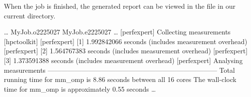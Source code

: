 When the job is finished, the generated report can be viewed in the file in our current directory.

\begin{prompt}
\dots
MyJob.o2225027
MyJob.e2225027
\dots
[perfexpert] Collecting measurements [hpctoolkit]
[perfexpert]    [1] 1.992842066 seconds (includes measurement overhead)
[perfexpert]    [2] 1.564767383 seconds (includes measurement overhead)
[perfexpert]    [3] 1.373591388 seconds (includes measurement overhead)
[perfexpert] Analysing measurements
---------------------------------------------------------------------------
Total running time for mm_omp is 8.86 seconds between all 16 cores
The wall-clock time for mm_omp is approximately 0.55 seconds
\dots
\end{prompt}

